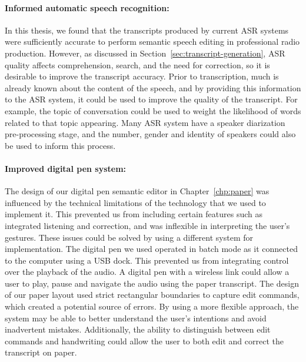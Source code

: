 \paragraph{Informed automatic speech recognition:}

In this thesis, we found that the transcripts produced by current ASR systems were sufficiently accurate to perform
semantic speech editing in professional radio production. However, as discussed in
Section~\ref{sec:transcript-generation}, ASR quality affects comprehension, search, and the need for correction, so it
is desirable to improve the transcript accuracy. Prior to transcription, much is already known about the content of the
speech, and by providing this information to the ASR system, it could be used to improve the quality of the transcript.
For example, the topic of conversation could be used to weight the likelihood of words related to that topic appearing.
Many ASR system have a speaker diarization pre-processing stage, and the number, gender and identity of speakers could
also be used to inform this process.

\paragraph{Improved digital pen system:}

The design of our digital pen semantic editor in Chapter~\ref{chp:paper} was influenced by the technical limitations of
the technology that we used to implement it.  This prevented us from including certain features such as integrated
listening and correction, and was inflexible in interpreting the user's gestures.  These issues could be solved by
using a different system for implementation.  The digital pen we used operated in batch mode as it connected to the
computer using a USB dock. This prevented us from integrating control over the playback of the audio. A digital pen
with a wireless link could allow a user to play, pause and navigate the audio using the paper transcript.  The design
of our paper layout used strict rectangular boundaries to capture edit commands, which created a potential source of
errors. By using a more flexible approach, the system may be able to better understand the user's intentions and avoid
inadvertent mistakes.  Additionally, the ability to distinguish between edit commands and handwriting could allow the
user to both edit and correct the transcript on paper.


